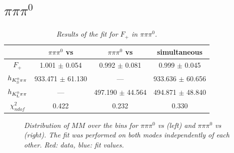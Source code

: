 \section{$\pi \pi \pi^0$}
\begin{table}[!h]
	\begin{center}
		\begin{tabular}{c| c|c|c}
			 & $\pi \pi \pi^0$ vs \KsPiPi & $\pi \pi \pi^0$ vs \KlPiPi & simultaneous \\
			\hline
			\hline
			$F_+$ &  1.001 $\pm$ 0.054 & 0.992 $\pm$ 0.081 & 0.999 $\pm$ 0.045 \\
			$h_{{K^0_{\rm\scriptscriptstyle S}}{\pi}\pi}$ & 933.471 $\pm$ 61.130 & --- &  933.636 $\pm$ 60.656 \\
			$h_{{K^0_{\rm\scriptscriptstyle L}}{\pi}\pi}$ & --- & 497.190 $\pm$ 44.564 & 494.871 $\pm$ 48.840 \\
			$\chi^2_{ndof}$ & 0.422 & 0.232 &  0.330 \\
\end{tabular}
\end{center}
\caption{\textit{Results of the fit for $F_+$ in $\pi \pi \pi^0$.}}
\end{table}
\clearpage
\begin{figure}[!h]
	\vspace*{-0.5cm}
	\begin{center}
		\vspace*{-0.5cm}
	\end{center}
	\caption{\textit{Distribution of $MM$ over the bins for $\pi \pi \pi^0$ vs \KsPiPi (left) and $\pi \pi \pi^0$ vs \KlPiPi (right). The fit was performed on both modes independently of each other. Red: data, blue: fit values. }}
\end{figure}\\


